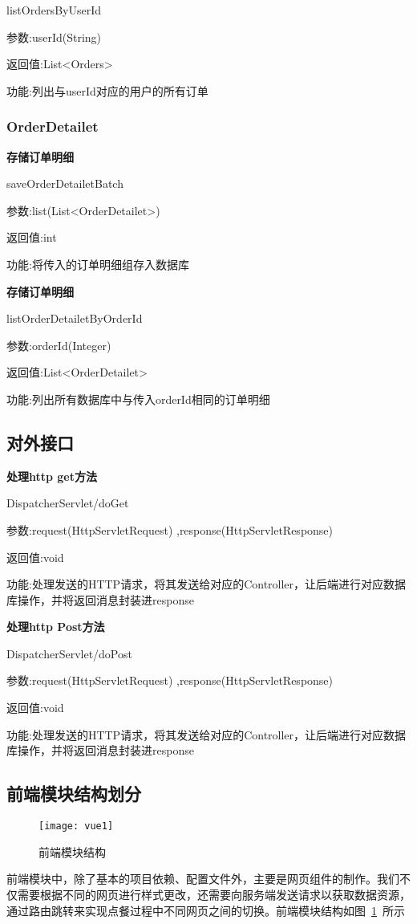 listOrdersByUserId

参数:userId(String)

返回值:List<Orders>

功能:列出与userId对应的用户的所有订单

\subsubsection{OrderDetailet}

\textbf{存储订单明细}

saveOrderDetailetBatch

参数:list(List<OrderDetailet>)

返回值:int

功能:将传入的订单明细组存入数据库

\textbf{存储订单明细}

listOrderDetailetByOrderId

参数:orderId(Integer)

返回值:List<OrderDetailet>

功能:列出所有数据库中与传入orderId相同的订单明细

\subsection{对外接口}
\textbf{处理http get方法}

DispatcherServlet/doGet

参数:request(HttpServletRequest) ,response(HttpServletResponse)

返回值:void

功能:处理发送的HTTP请求，将其发送给对应的Controller，让后端进行对应数据库操作，并将返回消息封装进response

\textbf{处理http Post方法}

DispatcherServlet/doPost

参数:request(HttpServletRequest) ,response(HttpServletResponse)

返回值:void

功能:处理发送的HTTP请求，将其发送给对应的Controller，让后端进行对应数据库操作，并将返回消息封装进response
\subsection{前端模块结构划分}
\begin{figure}[htbp]
    \centering
    \texttt{[image: vue1]}
    \caption{前端模块结构}\label{fig:vue1}
\end{figure}
前端模块中，除了基本的项目依赖、配置文件外，主要是网页组件的制作。我们不仅需要根据不同的网页进行样式更改，还需要向服务端发送请求以获取数据资源，通过路由跳转来实现点餐过程中不同网页之间的切换。前端模块结构如图~\ref{fig:vue1}~所示

